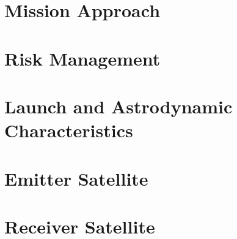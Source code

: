 \documentclass[11pt]{report}
\begin{document}
%
%

\chapter{Mission Approach}
\label{chap:mission_approach}









%
%

\chapter{Risk Management}
\label{chap:risk_management}


%
%
\chapter{Launch and Astrodynamic Characteristics}
\label{chap:astrodynamics}


%
%

\chapter{Emitter Satellite}
\label{chap:emitter}

%






%
%
	
\chapter{Receiver Satellite}
\label{chap:receiver}








%
%
\end{document}
